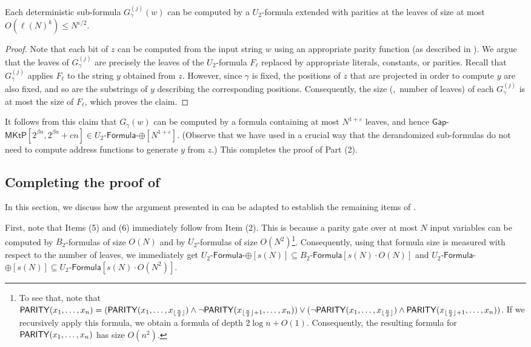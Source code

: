 \documentclass{toc}
\newcommand{\PARITY}{\ensuremath{{\sf PARITY}}\xspace}
\newcommand{\gapmktp}{\mathsf{Gap}$-$\mathsf{MKtP}}
\begin{document}
\begin{claim}
Each deterministic sub-formula $G_\gamma^{(j)}(w)$ can be computed by a $U_2$-formula extended with parities at the leaves of size at most $O(\ell(N)^k) \leq N^{\varepsilon/2}$.
\end{claim}

\begin{proof}
Note that each bit of $z$ can be computed from the input string $w$ using an appropriate parity function (as described in ). We argue that the leaves of $G_\gamma^{(j)}$ are precisely the leaves of the $U_2$-formula $F_{\ell}$ replaced by appropriate literals, constants, or parities. Recall that $G_\gamma^{(j)}$ applies $F_\ell$ to the string $y$ obtained from $z$. However, since $\gamma$ is fixed, the positions of $z$ that are projected in order to compute $y$ are also fixed, and so are the substrings of $y$ describing the corresponding positions. Consequently, the size (\ie,~number of leaves) of each $G^{(j)}_\gamma$ is at most the size of $F_\ell$, which proves the claim.
\end{proof}

It follows from this claim that $G_\gamma(w)$ can be computed by a formula containing at most $N^{1 + \varepsilon}$ leaves, and hence $\gapmktp[2^{\beta n}, 2^{\beta n} + cn] \in U_2$-$\mathsf{Formula}$-$\oplus[N^{1 + \varepsilon}]$. (Observe that we have used in a crucial way that the derandomized sub-formulas do not need to compute address functions to generate $y$ from $z$.) This completes the proof of  Part (2). 


\subsection{Completing the proof of }\label{ss:consequences}

In this section, we discuss how the argument presented in  can be adapted to establish the remaining items of .

First, note that Items (5) and (6) immediately follow from Item (2). This is because a parity gate over at most $N$ input variables can be computed by $B_2$-formulas of size $O(N)$ and by $U_2$-formulas of size $O(N^2)$\footnote{To see that, note that $\PARITY(x_1,\dots,x_n)=(\PARITY(x_1,\dots,x_{\lfloor\frac{n}{2}\rfloor})\wedge \neg\PARITY(x_{\lfloor\frac{n}{2}\rfloor+1},\dots,x_n))\vee (\neg\PARITY(x_1,\dots,x_{\lfloor\frac{n}{2}\rfloor})\wedge \PARITY(x_{\lfloor\frac{n}{2}\rfloor+1},\dots,x_n))$. If we recursively apply this formula, we obtain a formula of depth $2\log n+O(1)$. 
Consequently, the resulting formula for $\PARITY(x_1,\dots,x_n)$ has size $O(n^{2})$.}. Consequently, using that formula size is measured with respect to the number of leaves, we immediately get $U_2$-$\mathsf{Formula}$-$\oplus[s(N)] \subseteq B_2$-$\mathsf{Formula}[s(N) \cdot O(N)]$ and $U_2$-$\mathsf{Formula}$-$\oplus[s(N)] \subseteq U_2$-$\mathsf{Formula}[s(N) \cdot O(N^2)]$.
\end{document}
